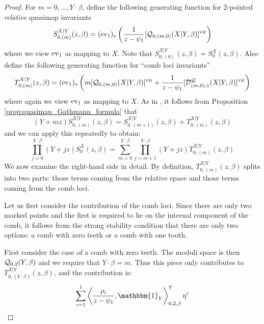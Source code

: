 \begin{proof}
For $m = 0, \ldots, Y \cdot \beta$, define the following generating function for $2$-pointed \emph{relative} quasimap invariants
 \[
  S_{0,(m)}^{X|Y}(z,\beta)=(\operatorname{ev}_1)_*\left(\frac{1}{z-\psi_1}[\mathcal{Q}_{0,(m,0)}(X|Y,\beta)]^{\mathrm{vir}}\right)
 \]
where we view $\operatorname{ev}_1$ as mapping to $X$.  Note that  $S_{0,(0)}^{X|Y}(z,\beta) = S_0^X(z, \beta)$. Also define the following generating function for ``comb loci invariants''
\[
 T_{0,(m)}^{X|Y}(z,\beta)=(\operatorname{ev}_1)_*\left(m [\mathcal{Q}_{0,(m,0)}(X|Y,\beta)]^{\mathrm{vir}}+\frac{1}{z-\psi_1} [\mathcal{D}^{\mathcal{Q}}_{(m,0),1}(X|Y,\beta)]^{\mathrm{vir}} \right)
\]
where again we view $\operatorname{ev}_1$ as mapping to $X$. As in \cite[Lemma 1.2]{Ga-MF}, it follows from Proposition \ref{prop:quasimap_Gathmann_formula} that
\begin{equation}
 (Y+mz) S_{0,(m)}^{X|Y}(z,\beta) = S_{0,(m+1)}^{X|Y}(z,\beta)+ T_{0,(m)}^{X|Y}(z,\beta)
\end{equation}
and we can apply this repeatedly to obtain:
\begin{equation} \label{eqn:G}
\prod_{j=0}^{Y\cdot\beta}(Y+jz) S_0^X(z,\beta) = \sum_{m=0}^{Y\cdot\beta}\prod_{j=m+1}^{Y\cdot\beta}(Y+jz)T_{0,(m)}^{X|Y}(z,\beta)
\end{equation}
We now examine the right-hand side in detail. By definition, $T_{0,(m)}^{X|Y}(z,\beta)$ splits into two parts: those terms coming from the relative space and those terms coming from the comb loci.

Let us first consider the contribution of the comb loci. Since there are only two marked points and the first is required to lie on the internal component of the comb, it follows from the strong stability condition that there are only two options: a comb with zero teeth or a comb with one tooth.

First consider the case of a comb with zero teeth. The moduli space is then $\mathcal{Q}_{0,2}(Y,\beta)$ and we require that $Y \cdot \beta = m$. Thus this piece only contributes to $T_{0,(Y\cdot\beta)}^{X|Y}(z,\beta)$, and the contribution is:
\begin{equation*} \sum_{i=1}^l \left\langle \dfrac{\rho_i}{z-\psi_1}, \mathbbm{1}_Y \right\rangle_{0,2,\beta}^Y \eta^i \end{equation*}


\end{proof}
